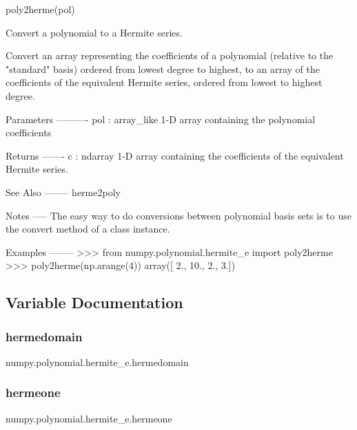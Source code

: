 \begin{DoxyVerb}poly2herme(pol)

Convert a polynomial to a Hermite series.

Convert an array representing the coefficients of a polynomial (relative
to the "standard" basis) ordered from lowest degree to highest, to an
array of the coefficients of the equivalent Hermite series, ordered
from lowest to highest degree.

Parameters
----------
pol : array_like
    1-D array containing the polynomial coefficients

Returns
-------
c : ndarray
    1-D array containing the coefficients of the equivalent Hermite
    series.

See Also
--------
herme2poly

Notes
-----
The easy way to do conversions between polynomial basis sets
is to use the convert method of a class instance.

Examples
--------
>>> from numpy.polynomial.hermite_e import poly2herme
>>> poly2herme(np.arange(4))
array([  2.,  10.,   2.,   3.])\end{DoxyVerb}
 

\subsection{Variable Documentation}
\mbox{\label{namespacenumpy_1_1polynomial_1_1hermite__e_a6cb51e2b612fa5954bbc0fed8cf1bdf1}} 
\subsubsection{\texorpdfstring{hermedomain}{hermedomain}}
{\footnotesize\ttfamily numpy.\+polynomial.\+hermite\+\_\+e.\+hermedomain}

\mbox{\label{namespacenumpy_1_1polynomial_1_1hermite__e_aac15baa19e3d9a3aa5c3b6096b38e28b}} 
\subsubsection{\texorpdfstring{hermeone}{hermeone}}
{\footnotesize\ttfamily numpy.\+polynomial.\+hermite\+\_\+e.\+hermeone}

